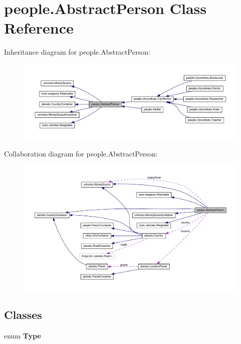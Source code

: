 \hypertarget{classpeople_1_1_abstract_person}{}\section{people.\+Abstract\+Person Class Reference}
\label{classpeople_1_1_abstract_person}


Inheritance diagram for people.\+Abstract\+Person\+:
\nopagebreak
\begin{figure}[H]
\begin{center}
\leavevmode
\includegraphics[width=350pt]{classpeople_1_1_abstract_person__inherit__graph}
\end{center}
\end{figure}


Collaboration diagram for people.\+Abstract\+Person\+:
\nopagebreak
\begin{figure}[H]
\begin{center}
\leavevmode
\includegraphics[width=350pt]{classpeople_1_1_abstract_person__coll__graph}
\end{center}
\end{figure}
\subsection*{Classes}
\begin{DoxyCompactItemize}
\item 
enum {\bfseries Type}
\end{DoxyCompactItemize}
